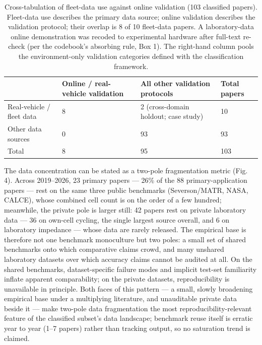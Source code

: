 \documentclass[journal]{IEEEtran}
\begin{document}
\begin{table}[!t]
\caption{Cross-tabulation of fleet-data use against online validation (103 classified papers). Fleet-data use describes the primary data source; online validation describes the validation protocol; their overlap is 8 of 10 fleet-data papers. A laboratory-data online demonstration was recoded to experimental hardware after full-text re-check (per the codebook's absorbing rule, Box 1). The right-hand column pools the environment-only validation categories defined with the classification framework.}
\label{tab:TABLE_FLEET}
\centering
\footnotesize
\begin{tabular}{|p{1.55in}|p{1.99in}|p{2.24in}|p{0.75in}|}
\hline
\textbf{} & \textbf{Online / real-vehicle validation} & \textbf{All other validation protocols} & \textbf{Total papers} \\
\hline
Real-vehicle / fleet data & 8 & 2 (cross-domain holdout; case study) & 10 \\
Other data sources & 0 & 93 & 93 \\
Total & 8 & 95 & 103 \\
\hline
\hline
\end{tabular}
\end{table}

The data concentration can be stated as a two-pole fragmentation metric (Fig. 4). Across 2019--2026, 23 primary papers --- 26\% of the 88 primary-application papers --- rest on the same three public benchmarks (Severson/MATR, NASA, CALCE), whose combined cell count is on the order of a few hundred; meanwhile, the private pole is larger still: 42 papers rest on private laboratory data --- 36 on own-cell cycling, the single largest source overall, and 6 on laboratory impedance --- whose data are rarely released. The empirical base is therefore not one benchmark monoculture but two poles: a small set of shared benchmarks onto which comparative claims crowd, and many unshared laboratory datasets over which accuracy claims cannot be audited at all. On the shared benchmarks, dataset-specific failure modes and implicit test-set familiarity inflate apparent comparability; on the private datasets, reproducibility is unavailable in principle. Both faces of this pattern --- a small, slowly broadening empirical base under a multiplying literature, and unauditable private data beside it --- make two-pole data fragmentation the most reproducibility-relevant feature of the classified subset's data landscape; benchmark reuse itself is erratic year to year (1--7 papers) rather than tracking output, so no saturation trend is claimed.
\end{document}
